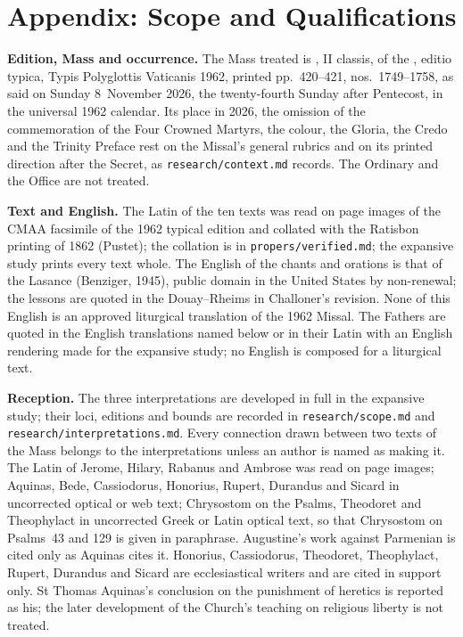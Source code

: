 
\section{Appendix: Scope and Qualifications}

{\footnotesize
\textbf{Edition, Mass and occurrence.} The Mass treated is , II classis, of the , editio typica, Typis Polyglottis Vaticanis 1962, printed
pp.~420--421, nos.~1749--1758, as said on Sunday 8~November 2026, the
twenty-fourth Sunday after Pentecost, in the universal 1962 calendar. Its place in 2026, the omission of the commemoration of
the Four Crowned Martyrs, the colour, the Gloria, the Credo and the Trinity
Preface rest on the Missal's general rubrics and on its printed direction
after the Secret, as \texttt{research/context.md} records. The Ordinary and
the Office are not treated.

\textbf{Text and English.} The Latin of the ten texts was read on page images
of the CMAA facsimile of the 1962 typical edition and collated with the
Ratisbon printing of 1862 (Pustet); the collation is in
\texttt{propers/verified.md}; the expansive study prints every text whole.
The English of the chants and orations is that of the Lasance 
(Benziger, 1945), public domain in the United States by non-renewal; the
lessons are quoted in the Douay--Rheims in Challoner's revision. None of this
English is an approved liturgical translation of the 1962 Missal. The Fathers are quoted in the English
translations named below or in their Latin with an English rendering made for
the expansive study; no English is composed for a liturgical text.

\textbf{Reception.} The three interpretations are developed in full in the
expansive study; their loci, editions and bounds are recorded in
\texttt{research/scope.md} and \texttt{research/interpretations.md}. Every
connection drawn between two texts of the Mass belongs to the interpretations
unless an author is named as making it. The Latin of Jerome, Hilary, Rabanus
and Ambrose was read on page images; Aquinas, Bede, Cassiodorus, Honorius, Rupert,
Durandus and Sicard in uncorrected optical or web text; Chrysostom on the
Psalms, Theodoret and Theophylact in uncorrected Greek or Latin optical text,
so that Chrysostom on Psalms~43 and 129 is given in paraphrase. Augustine's work against
Parmenian is cited only as Aquinas cites it. Honorius, Cassiodorus, Theodoret, Theophylact, Rupert, Durandus and Sicard are
ecclesiastical writers and are cited in support only. St Thomas Aquinas's
conclusion on the punishment of heretics is reported as his; the later
development of the Church's teaching on religious liberty is not treated.

}

